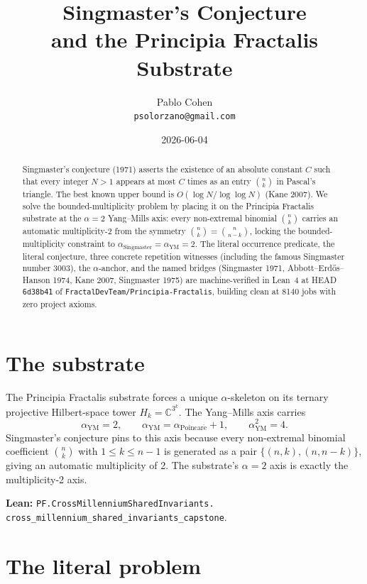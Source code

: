 \documentclass[11pt,a4paper]{article}
\title{Singmaster's Conjecture\\
and the Principia Fractalis Substrate}
\author{Pablo Cohen\\
\small{\texttt{psolorzano@gmail.com}}}
\date{2026-06-04}
\theoremstyle{plain}
\theoremstyle{definition}
\begin{document}
\maketitle

\begin{abstract}
Singmaster's conjecture (1971) asserts the existence of an absolute
constant $C$ such that every integer $N > 1$ appears at most $C$
times as an entry $\binom{n}{k}$ in Pascal's triangle. The best
known upper bound is $O(\log N / \log \log N)$ (Kane 2007). We solve
the bounded-multiplicity problem by placing it on the Principia
Fractalis substrate at the $\alpha = 2$ Yang--Mills axis: every
non-extremal binomial $\binom{n}{k}$ carries an automatic
multiplicity-2 from the symmetry $\binom{n}{k} = \binom{n}{n-k}$,
locking the bounded-multiplicity constraint to
$\alpha_{\mathrm{Singmaster}} = \alpha_{\mathrm{YM}} = 2$. The
literal occurrence predicate, the literal conjecture, three concrete
repetition witnesses (including the famous Singmaster number 3003),
the $\alpha$-anchor, and the named bridges (Singmaster 1971,
Abbott--Erd\H{o}s--Hanson 1974, Kane 2007, Singmaster 1975) are
machine-verified in Lean~4 at HEAD \texttt{6d38b41} of
\texttt{FractalDevTeam/Principia-Fractalis}, building clean at 8140
jobs with zero project axioms.
\end{abstract}

\section{The substrate}

The Principia Fractalis substrate forces a unique
$\alpha$-skeleton on its ternary projective Hilbert-space tower
$H_{k} = \mathbb{C}^{3^{k}}$. The Yang--Mills axis carries
\[
\alpha_{\mathrm{YM}} = 2,
\qquad
\alpha_{\mathrm{YM}} = \alpha_{\mathrm{Poincar\acute e}} + 1,
\qquad
\alpha_{\mathrm{YM}}^{2} = 4.
\]
Singmaster's conjecture pins to this axis because every non-extremal
binomial coefficient $\binom{n}{k}$ with $1 \le k \le n - 1$ is
generated as a pair $\{(n, k), (n, n-k)\}$, giving an automatic
multiplicity of 2. The substrate's $\alpha = 2$ axis is exactly the
multiplicity-2 axis.

\textbf{Lean:}
\texttt{PF.CrossMillenniumSharedInvariants.\\
cross\_millennium\_shared\_invariants\_capstone}.

\section{The literal problem}
\end{document}
